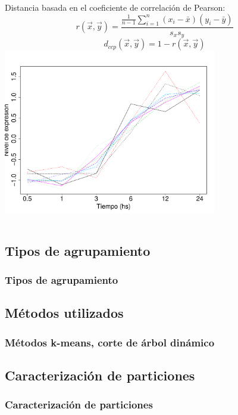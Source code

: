 \documentclass[serif,9pt, t]{beamer}
\begin{document}
\begin{frame}
\begin{columns}[T]
	Distancia basada en el coeficiente de correlación de Pearson:\\
	\begin{equation}
		r(\vec{x}, \vec{y}) = \frac{\frac{1}{n-1}\sum\limits_{i=1}^n(x_i-\bar{x})(y_i-\bar{y})}{s_x s_y}
	\end{equation}
	\begin{equation}
		d_{ccp}(\vec{x}, \vec{y}) = 1-r(\vec{x}, \vec{y})
	\end{equation}
	\centering	
	\includegraphics[width=0.7\textwidth]{perfiles_coregulados.pdf}
\end{columns}

\end{frame}

\subsection{Tipos de agrupamiento}
\begin{frame}
\frametitle{Tipos de agrupamiento} 
\end{frame}

\subsection{Métodos utilizados}
\begin{frame}
\frametitle{Métodos k-means, corte de árbol dinámico} 
\end{frame}

\subsection{Caracterización de particiones}
\begin{frame}
\frametitle{Caracterización de particiones} 
\end{frame}
\end{document}
